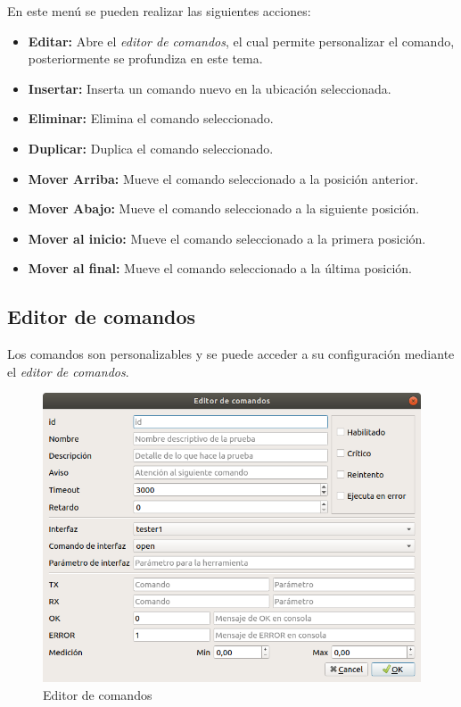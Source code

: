 \documentclass[a4paper,12pt]{refart}
\newcommand\commandEditor{\textit{editor de comandos}}
\begin{document}
En este menú se pueden realizar las siguientes acciones:

\begin{itemize}
\item \textbf{Editar:} Abre el \commandEditor{}, el cual permite personalizar el comando, posteriormente se profundiza en este tema.
\item \textbf{Insertar:} Inserta un comando nuevo en la ubicación seleccionada.
\item \textbf{Eliminar:} Elimina el comando seleccionado.
\item \textbf{Duplicar:} Duplica el comando seleccionado.
\item \textbf{Mover Arriba:} Mueve el comando seleccionado a la posición anterior.
\item \textbf{Mover Abajo:} Mueve el comando seleccionado a la siguiente posición.
\item \textbf{Mover al inicio:} Mueve el comando seleccionado a la primera posición.
\item \textbf{Mover al final:} Mueve el comando seleccionado a la última posición.
\end{itemize}

\subsection{Editor de comandos}
Los comandos son personalizables y se puede acceder a su configuración mediante el \commandEditor{}.

\begin{figure}[hbt!]\centering
\includegraphics[scale=0.4, frame]{images/command_editor} 
\caption{Editor de comandos}
\label{fig:commandEditor}
\end{figure}
\end{document}
